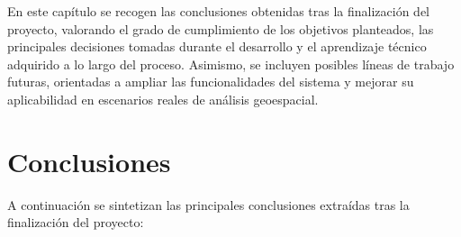 
En este capítulo se recogen las conclusiones obtenidas tras la finalización del proyecto, valorando el grado de cumplimiento de los objetivos planteados, las principales decisiones tomadas durante el desarrollo y el aprendizaje técnico adquirido a lo largo del proceso. Asimismo, se incluyen posibles líneas de trabajo futuras, orientadas a ampliar las funcionalidades del sistema y mejorar su aplicabilidad en escenarios reales de análisis geoespacial.

\section{Conclusiones}

A continuación se sintetizan las principales conclusiones extraídas tras la finalización del proyecto:

